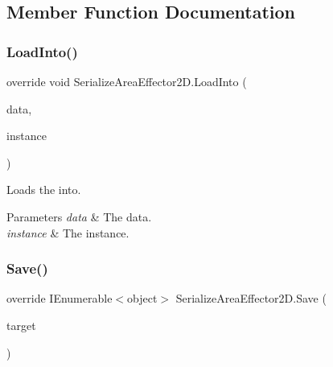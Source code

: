 \subsection{Member Function Documentation}
\mbox{\label{class_serialize_area_effector2_d_ada592141d2f3deee413dc4b88389363d}} 
\subsubsection{\texorpdfstring{Load\+Into()}{LoadInto()}}
{\footnotesize\ttfamily override void Serialize\+Area\+Effector2\+D.\+Load\+Into (\begin{DoxyParamCaption}\item[{object \mbox{[}$\,$\mbox{]}}]{data,  }\item[{Area\+Effector2D}]{instance }\end{DoxyParamCaption})\hspace{0.3cm}{\ttfamily [inline]}}



Loads the into. 


\begin{DoxyParams}{Parameters}
{\em data} & The data.\\
\hline
{\em instance} & The instance.\\
\hline
\end{DoxyParams}
\mbox{\label{class_serialize_area_effector2_d_a5d668a4b846f9371ddf87dc74d845d22}} 
\subsubsection{\texorpdfstring{Save()}{Save()}}
{\footnotesize\ttfamily override I\+Enumerable$<$object$>$ Serialize\+Area\+Effector2\+D.\+Save (\begin{DoxyParamCaption}\item[{Area\+Effector2D}]{target }\end{DoxyParamCaption})\hspace{0.3cm}{\ttfamily [inline]}}




